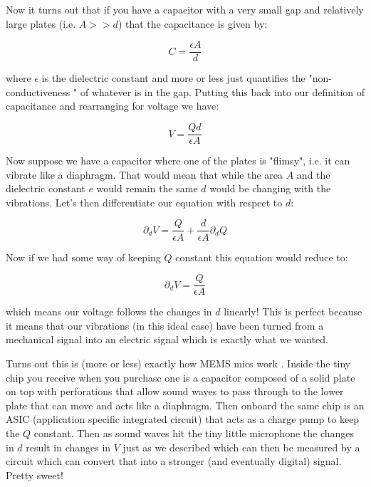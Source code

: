 \documentclass[10pt,a5paper]{book}
\begin{document}
Now it turns out that if you have a capacitor with a very small gap and relatively large plates (i.e. $A >> d$) that the capacitance is given by:

\begin{equation}
C = \frac{\epsilon A}{d}
\end{equation}

where $\epsilon$ is the dielectric constant and more or less just quantifies the "non-conductiveness " of whatever is in the gap. Putting this back into our definition of capacitance and rearranging for voltage we have:

\begin{equation}
V=\frac{Qd}{\epsilon A}
\end{equation}

Now suppose we have a capacitor where one of the plates is "flimsy", i.e. it can vibrate like a diaphragm. That would mean that while the area $A$ and the dielectric constant $e$ would remain the same $d$ would be changing with the vibrations. Let's then differentiate our equation with respect to $d$:

\begin{equation}
\partial_d V = \frac{Q}{\epsilon A} + \frac{d}{\epsilon A}\partial_d Q
\end{equation}

Now if we had some way of keeping $Q$ constant this equation would reduce to:

\begin{equation}
\partial_d V = \frac{Q}{\epsilon A}
\end{equation}

which means our voltage follows the changes in $d$ linearly! This is perfect because it means that our vibrations (in this ideal case) have been turned from a mechanical signal into an electric signal which is exactly what we wanted. 

Turns out this is (more or less) exactly how MEMS mics work \cite{afox}. Inside the tiny chip you receive when you purchase one is a capacitor composed of a solid plate on top with perforations that allow sound waves to pass through to the lower plate that can move and acts like a diaphragm. Then onboard the same chip is an ASIC (application specific integrated circuit) that acts as a charge pump to keep the $Q$ constant. Then as sound waves hit the tiny little microphone the changes in $d$ result in changes in $V$ just as we described which can then be measured by a circuit which can convert that into a stronger (and eventually digital) signal. Pretty sweet!
\end{document}
